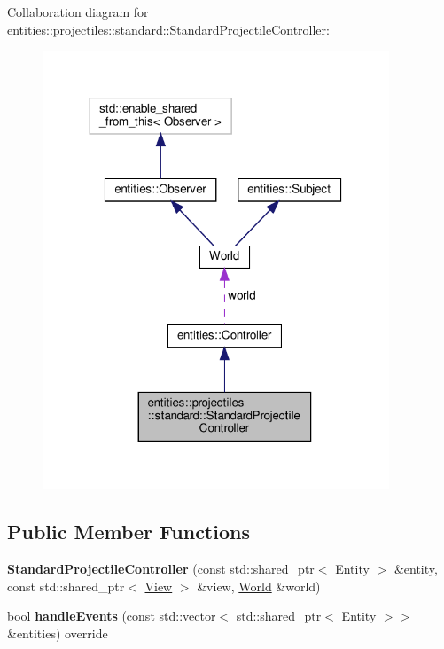 Collaboration diagram for entities\+:\+:projectiles\+:\+:standard\+:\+:Standard\+Projectile\+Controller\+:\nopagebreak
\begin{figure}[H]
\begin{center}
\leavevmode
\includegraphics[width=293pt]{classentities_1_1projectiles_1_1standard_1_1StandardProjectileController__coll__graph}
\end{center}
\end{figure}
\subsection*{Public Member Functions}
\begin{DoxyCompactItemize}
\item 
\mbox{\label{classentities_1_1projectiles_1_1standard_1_1StandardProjectileController_a9d31e5fdb4680c3ce373bfb494a5920e}} 
{\bfseries Standard\+Projectile\+Controller} (const std\+::shared\+\_\+ptr$<$ \hyperlink{classentities_1_1Entity}{Entity} $>$ \&entity, const std\+::shared\+\_\+ptr$<$ \hyperlink{classentities_1_1View}{View} $>$ \&view, \hyperlink{classWorld}{World} \&world)
\item 
\mbox{\label{classentities_1_1projectiles_1_1standard_1_1StandardProjectileController_ad591fceeeebeb569a4d5a1915cadaa6b}} 
bool {\bfseries handle\+Events} (const std\+::vector$<$ std\+::shared\+\_\+ptr$<$ \hyperlink{classentities_1_1Entity}{Entity} $>$$>$ \&entities) override
\end{DoxyCompactItemize}
